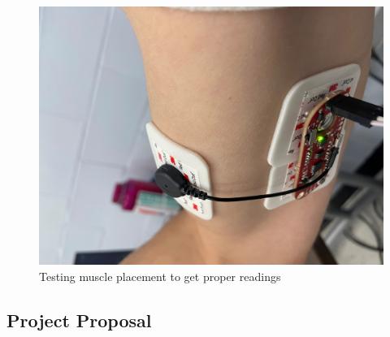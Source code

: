 \documentclass[11pt,letterpaper]{article}
\begin{document}
\begin{figure}[htbp]
\centering
\includegraphics[scale=0.1]{Final_Report/figs/SensorPlacement.jpg}
\caption{Testing muscle placement to get proper readings} %
\label{fig:sensorplacement}
\end{figure}
\newpage
\subsection*{Project Proposal}



\end{document}
